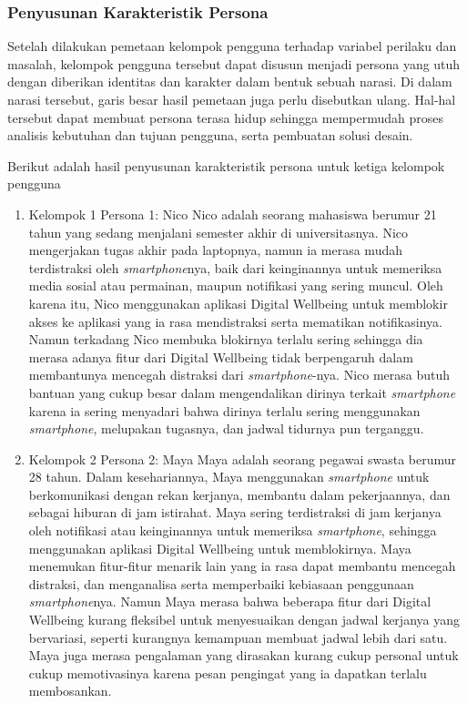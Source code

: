 \subsubsection{Penyusunan Karakteristik Persona}
Setelah dilakukan pemetaan kelompok pengguna terhadap variabel perilaku dan masalah, kelompok pengguna tersebut dapat disusun menjadi persona yang utuh dengan diberikan identitas dan karakter dalam bentuk sebuah narasi. Di dalam narasi tersebut, garis besar hasil pemetaan juga perlu disebutkan ulang. Hal-hal tersebut dapat membuat persona terasa hidup sehingga mempermudah proses analisis kebutuhan dan tujuan pengguna, serta pembuatan solusi desain.

Berikut adalah hasil penyusunan karakteristik persona untuk ketiga kelompok pengguna

\begin{enumerate}
  \item Kelompok 1 \textemdash \space Persona 1: Nico
  \subitem Nico adalah seorang mahasiswa berumur 21 tahun yang sedang menjalani semester akhir di universitasnya. Nico mengerjakan tugas akhir pada laptopnya, namun ia merasa mudah terdistraksi oleh \textit{smartphone}nya, baik dari keinginannya untuk memeriksa media sosial atau permainan, maupun notifikasi yang sering muncul. Oleh karena itu, Nico menggunakan aplikasi Digital Wellbeing untuk memblokir akses ke aplikasi yang ia rasa mendistraksi serta mematikan notifikasinya. Namun terkadang Nico membuka blokirnya terlalu sering sehingga dia merasa adanya fitur dari Digital Wellbeing tidak berpengaruh dalam membantunya mencegah distraksi dari \textit{smartphone}-nya. Nico merasa butuh bantuan yang cukup besar dalam mengendalikan dirinya terkait \textit{smartphone} karena ia sering menyadari bahwa dirinya terlalu sering menggunakan \textit{smartphone}, melupakan tugasnya, dan jadwal tidurnya pun terganggu.

  \item Kelompok 2 \textemdash \space Persona 2: Maya
  \subitem Maya adalah seorang pegawai swasta berumur 28 tahun. Dalam kesehariannya, Maya menggunakan \textit{smartphone} untuk berkomunikasi dengan rekan kerjanya, membantu dalam pekerjaannya, dan sebagai hiburan di jam istirahat. Maya sering terdistraksi di jam kerjanya oleh notifikasi atau keinginannya untuk memeriksa \textit{smartphone}, sehingga menggunakan aplikasi Digital Wellbeing untuk memblokirnya. Maya menemukan fitur-fitur menarik lain yang ia rasa dapat membantu mencegah distraksi, dan menganalisa serta memperbaiki kebiasaan penggunaan \textit{smartphone}nya. Namun Maya merasa bahwa beberapa fitur dari Digital Wellbeing kurang fleksibel untuk menyesuaikan dengan jadwal kerjanya yang bervariasi, seperti kurangnya kemampuan membuat jadwal lebih dari satu. Maya juga merasa pengalaman yang dirasakan kurang cukup personal untuk cukup memotivasinya karena pesan pengingat yang ia dapatkan terlalu membosankan.


\end{enumerate}
